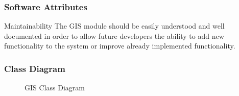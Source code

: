 \subsubsection{Software Attributes}

Maintainability
The GIS module should be easily understood and well documented in order to allow future developers the ability to add new functionality to the system or improve already implemented functionality.

\subsubsection{Class Diagram}

	\begin{figure}[h!]


\caption{GIS Class Diagram}

	\end{figure}
